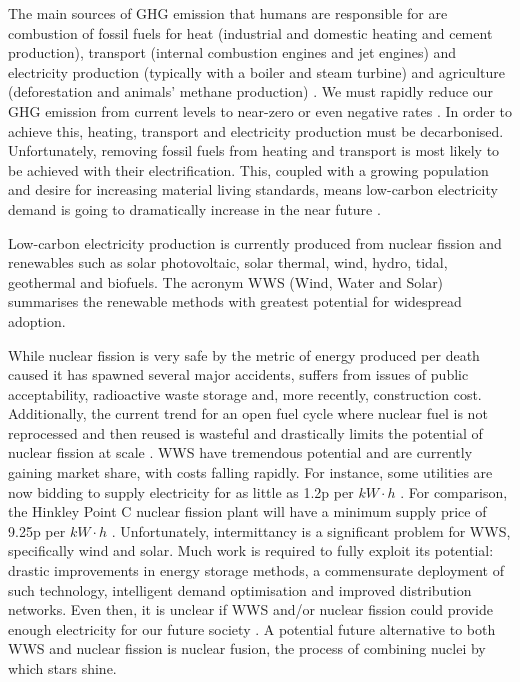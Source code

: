 The main sources of GHG emission that humans are responsible for are combustion of fossil fuels for heat (industrial and domestic heating and cement production), transport (internal combustion engines and jet engines) and electricity production (typically with a boiler and steam turbine) and agriculture (deforestation and animals' methane production) \cite{}. We must rapidly reduce our GHG emission from current levels to near-zero or even negative rates \cite{}. In order to achieve this, heating, transport and electricity production must be decarbonised. Unfortunately, removing fossil fuels from heating and transport is most likely to be achieved with their electrification. This, coupled with a growing population and desire for increasing material living standards, means low-carbon electricity demand is going to dramatically increase in the near future \cite{}. 


Low-carbon electricity production is currently produced from nuclear fission and renewables such as solar photovoltaic, solar thermal, wind, hydro, tidal, geothermal and biofuels. The acronym WWS (Wind, Water and Solar) summarises the renewable methods with greatest potential for widespread adoption. 

While nuclear fission is very safe by the metric of energy produced per death caused \cite{} it has spawned several major accidents, suffers from issues of public acceptability, radioactive waste storage and, more recently, construction cost. Additionally, the current trend for an open fuel cycle where nuclear fuel is not reprocessed and then reused is wasteful and drastically limits the potential of nuclear fission at scale \cite{}. WWS have tremendous potential and are currently gaining market share, with costs falling rapidly. For instance, some utilities are now bidding to supply electricity for as little as 1.2p per $kW \cdot h$ \cite{}. For comparison, the Hinkley Point C nuclear fission plant will have a minimum supply price of 9.25p per $kW \cdot h$ \cite{}. Unfortunately, intermittancy is a significant problem for WWS, specifically wind and solar. Much work is required to fully exploit its potential: drastic improvements in energy storage methods, a commensurate deployment of such technology, intelligent demand optimisation and improved distribution networks. Even then, it is unclear if WWS and/or nuclear fission could provide enough electricity for our future society \cite{}. A potential future alternative to both WWS and nuclear fission is nuclear fusion, the process of combining nuclei by which stars shine.


